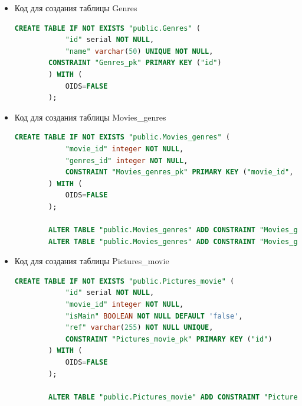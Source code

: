 \documentclass[a4paper,12pt]{article}
\renewcommand{\^}[2]{#1^{\, #2} \kern -1pt}
\newcommand{\1}{\kern 1pt}
\newcommand{\0}{\kern -1pt}
\begin{document}
\begin{itemize}
	\begin{lstlisting}[style=vscode-dark, language=SQL, label={code:sql}]
		CREATE TABLE IF NOT EXISTS "public.Movies" (
			"id" serial NOT NULL,
			"name" varchar(255) NOT NULL,
			"release_date" DATE,
			"duration" TIME NOT NULL,
			"mpaa" varchar(10),
			"rating" float4,
			"kp_id" varchar(255),
			"description" TEXT,
			CONSTRAINT "Movies_pk" PRIMARY KEY ("id")
		) WITH (
			OIDS=FALSE
		);
	\end{lstlisting}


	\item Код для создания таблицы Genres

	\begin{lstlisting}[style=vscode-dark, language=SQL, label={code:sql}]
		CREATE TABLE IF NOT EXISTS "public.Genres" (
			"id" serial NOT NULL,
			"name" varchar(50) UNIQUE NOT NULL,
		CONSTRAINT "Genres_pk" PRIMARY KEY ("id")
		) WITH (
			OIDS=FALSE
		);
	\end{lstlisting}

	\item Код для создания таблицы Movies\_genres

	\begin{lstlisting}[style=vscode-dark, language=SQL, label={code:sql}]
		CREATE TABLE IF NOT EXISTS "public.Movies_genres" (
			"movie_id" integer NOT NULL,
			"genres_id" integer NOT NULL,
			CONSTRAINT "Movies_genres_pk" PRIMARY KEY ("movie_id", "genres_id")
		) WITH (
			OIDS=FALSE
		);
		
		ALTER TABLE "public.Movies_genres" ADD CONSTRAINT "Movies_genres_fk0" FOREIGN KEY ("movie_id") REFERENCES "public.Movies"("id");
		ALTER TABLE "public.Movies_genres" ADD CONSTRAINT "Movies_genres_fk1" FOREIGN KEY ("genres_id") REFERENCES "public.Genres"("id");
	\end{lstlisting}

	\item Код для создания таблицы Pictures\_movie

	\begin{lstlisting}[style=vscode-dark, language=SQL, label={code:sql}]
		CREATE TABLE IF NOT EXISTS "public.Pictures_movie" (
			"id" serial NOT NULL,
			"movie_id" integer NOT NULL,
			"isMain" BOOLEAN NOT NULL DEFAULT 'false',
			"ref" varchar(255) NOT NULL UNIQUE,
			CONSTRAINT "Pictures_movie_pk" PRIMARY KEY ("id")
		) WITH (
			OIDS=FALSE
		);
		
		ALTER TABLE "public.Pictures_movie" ADD CONSTRAINT "Pictures_movie_fk0" FOREIGN KEY ("movie_id") REFERENCES "public.Movies"("id");
	\end{lstlisting}
	

\end{itemize}
\end{document}
